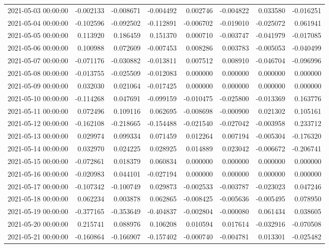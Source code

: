 \begin{tabular}{lrrrrrrr}
2021-05-03 00:00:00 & -0.002133 & -0.008671 & -0.004492 & 0.002746 & -0.004822 & 0.033580 & -0.016251 \\
2021-05-04 00:00:00 & -0.102596 & -0.092502 & -0.112891 & -0.006702 & -0.019010 & -0.025072 & 0.061941 \\
2021-05-05 00:00:00 & 0.113920 & 0.186459 & 0.151370 & 0.000710 & -0.003747 & -0.041979 & -0.017085 \\
2021-05-06 00:00:00 & 0.100988 & 0.072609 & -0.007453 & 0.008286 & 0.003783 & -0.005053 & -0.040499 \\
2021-05-07 00:00:00 & -0.071176 & -0.030882 & -0.013811 & 0.007512 & 0.008910 & -0.046704 & -0.096996 \\
2021-05-08 00:00:00 & -0.013755 & -0.025509 & -0.012083 & 0.000000 & 0.000000 & 0.000000 & 0.000000 \\
2021-05-09 00:00:00 & 0.032030 & 0.021064 & -0.017425 & 0.000000 & 0.000000 & 0.000000 & 0.000000 \\
2021-05-10 00:00:00 & -0.114268 & 0.047691 & -0.099159 & -0.010475 & -0.025800 & -0.013369 & 0.163776 \\
2021-05-11 00:00:00 & 0.072496 & 0.109116 & 0.062695 & -0.008698 & -0.000900 & 0.021302 & 0.105161 \\
2021-05-12 00:00:00 & -0.162108 & -0.218665 & -0.154488 & -0.021540 & -0.027042 & -0.003958 & 0.233712 \\
2021-05-13 00:00:00 & 0.029974 & 0.099334 & 0.071459 & 0.012264 & 0.007194 & -0.005304 & -0.176320 \\
2021-05-14 00:00:00 & 0.032970 & 0.024225 & 0.028925 & 0.014889 & 0.023042 & -0.006672 & -0.206741 \\
2021-05-15 00:00:00 & -0.072861 & 0.018379 & 0.060834 & 0.000000 & 0.000000 & 0.000000 & 0.000000 \\
2021-05-16 00:00:00 & -0.020983 & 0.044101 & -0.027194 & 0.000000 & 0.000000 & 0.000000 & 0.000000 \\
2021-05-17 00:00:00 & -0.107342 & -0.100749 & 0.029873 & -0.002533 & -0.003787 & -0.023023 & 0.047246 \\
2021-05-18 00:00:00 & 0.062234 & 0.003878 & 0.062865 & -0.008425 & -0.005636 & -0.005495 & 0.078950 \\
2021-05-19 00:00:00 & -0.377165 & -0.353649 & -0.404837 & -0.002804 & -0.000080 & 0.061434 & 0.038605 \\
2021-05-20 00:00:00 & 0.215741 & 0.088976 & 0.106208 & 0.010594 & 0.017614 & -0.032916 & -0.070508 \\
2021-05-21 00:00:00 & -0.160864 & -0.166907 & -0.157402 & -0.000740 & -0.004781 & 0.013301 & -0.025482 \\

\end{tabular}
